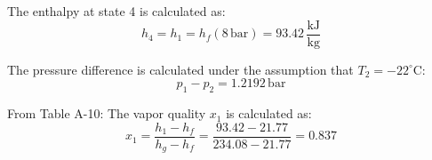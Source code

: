 The enthalpy at state 4 is calculated as:  
\[
h_4 = h_1 = h_f(8 \, \text{bar}) = 93.42 \, \frac{\text{kJ}}{\text{kg}}
\]  

The pressure difference is calculated under the assumption that \( T_2 = -22^\circ\text{C} \):  
\[
p_1 - p_2 = 1.2192 \, \text{bar}
\]  

From Table A-10:  
The vapor quality \( x_1 \) is calculated as:  
\[
x_1 = \frac{h_1 - h_f}{h_g - h_f} = \frac{93.42 - 21.77}{234.08 - 21.77} = 0.837
\]